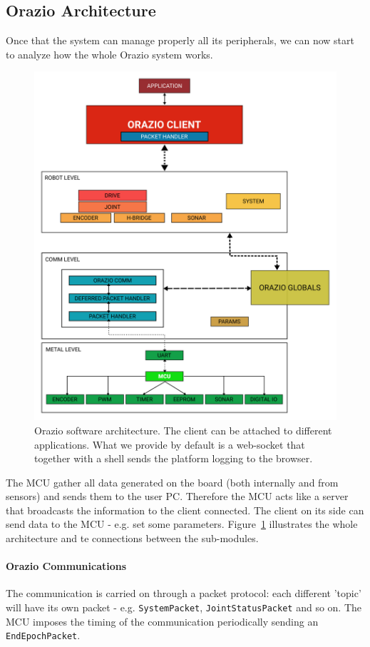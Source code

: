 \documentclass[10pt,a4paper, notitlepage]{report}
\begin{document}
\subsection*{Orazio Architecture}
Once that the system can manage properly all its peripherals, we can now start to analyze how the whole Orazio system works.

\begin{figure}[!h]
  \centering
  \includegraphics[width=0.8\linewidth]{pics/orazio_arch}
  \caption{Orazio software architecture. The client can be attached to different applications. What we provide by default is a web-socket that together with a shell sends the platform logging to the browser.}
  \label{fig:orazio_arch}
\end{figure}

The MCU gather all data generated on the board (both internally and from sensors) and sends them to the user PC. Therefore the MCU acts like a server that broadcasts the information to the client connected. The client on its side can send data to the MCU - e.g. set some parameters. Figure~\ref{fig:orazio_arch} illustrates the whole architecture and te connections between the sub-modules.

\paragraph{Orazio Communications} The communication is carried on through a packet protocol: each different 'topic' will have its own packet - e.g. \texttt{SystemPacket}, \texttt{JointStatusPacket} and so on. The MCU imposes the timing of the communication periodically sending an \texttt{EndEpochPacket}.
\end{document}
